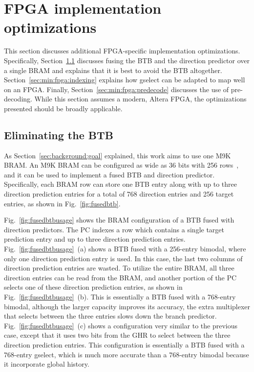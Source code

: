 \section{FPGA implementation optimizations}
\label{sec:min:fpga}
This section discusses additional FPGA-specific implementation optimizations. Specifically, Section~\ref{sec:min:fpga:nobtb} discusses fusing the BTB and the direction predictor over a single BRAM and explains that it is best to avoid the BTB altogether. Section~\ref{sec:min:fpga:indexing} explains how gselect can be adapted to map well on an FPGA. Finally, Section~\ref{sec:min:fpga:predecode} discusses the use of pre-decoding. While this section assumes a modern, Altera FPGA, the optimizations presented should be broadly applicable.

\subsection{Eliminating the BTB}
\label{sec:min:fpga:nobtb}
As Section~\ref{sec:background:goal} explained, this work aims to use one M9K BRAM. An M9K BRAM can be configured as wide as 36 bits with 256 rows~\cite{StratixIVM9K}, and it can be used to implement a fused BTB and direction predictor. Specifically, each BRAM row can store one BTB entry along with up to three direction prediction entries for a total of 768 direction entries and 256 target entries, as shown in Fig.~\ref{fig:fusedbtb}.

Fig.~\ref{fig:fusedbtbusage} shows the BRAM configuration of a BTB fused with direction predictors. The PC indexes a row which contains a single target prediction entry and up to three direction prediction entries. Fig.~\ref{fig:fusedbtbusage}~(a) shows a BTB fused with a 256-entry bimodal, where only one direction prediction entry is used. In this case, the last two columns of direction prediction entries are wasted. To utilize the entire BRAM, all three direction entries can be read from the BRAM, and another portion of the PC selects one of these direction prediction entries, as shown in Fig.~\ref{fig:fusedbtbusage}~(b). This is essentially a BTB fused with a 768-entry bimodal, although the larger capacity improves its accuracy, the extra multiplexer that selects between the three entries slows down the branch predictor. Fig.~\ref{fig:fusedbtbusage}~(c) shows a configuration very similar to the previous case, except that it uses two bits from the GHR to select between the three direction prediction entries. This configuration is essentially a BTB fused with a 768-entry gselect, which is much more accurate than a 768-entry bimodal because it incorporate global history. 

